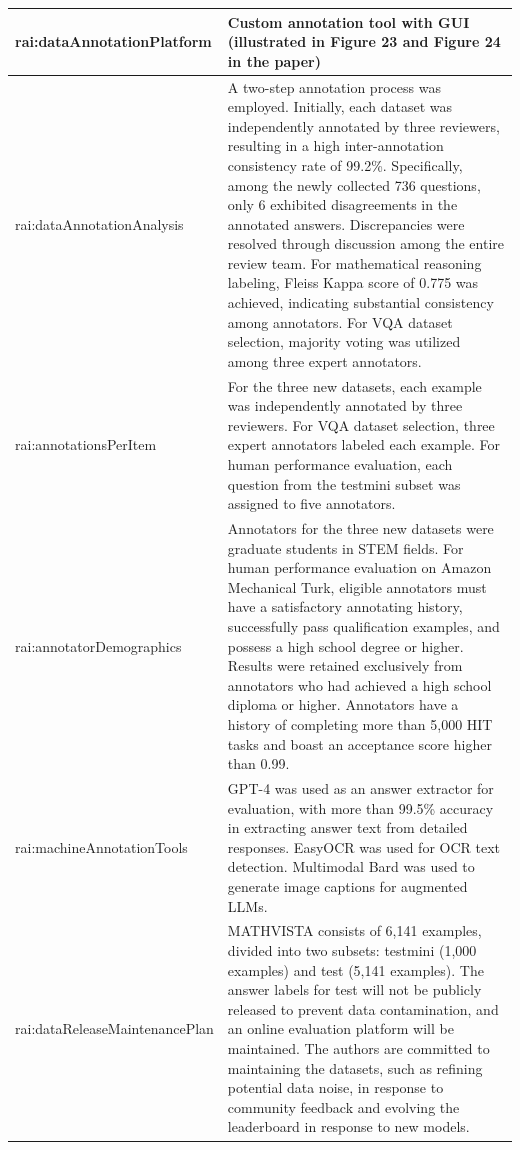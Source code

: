\documentclass[10pt,a4paper]{article}
\begin{document}
\begin{longtable}{|p{4cm}|p{12cm}|}
\hline
rai:dataAnnotationPlatform & Custom annotation tool with GUI (illustrated in Figure 23 and Figure 24 in the paper) \\
\hline
rai:dataAnnotationAnalysis & A two-step annotation process was employed. Initially, each dataset was independently annotated by three reviewers, resulting in a high inter-annotation consistency rate of 99.2\%. Specifically, among the newly collected 736 questions, only 6 exhibited disagreements in the annotated answers. Discrepancies were resolved through discussion among the entire review team. For mathematical reasoning labeling, Fleiss Kappa score of 0.775 was achieved, indicating substantial consistency among annotators. For VQA dataset selection, majority voting was utilized among three expert annotators. \\
\hline
rai:annotationsPerItem & For the three new datasets, each example was independently annotated by three reviewers. For VQA dataset selection, three expert annotators labeled each example. For human performance evaluation, each question from the testmini subset was assigned to five annotators. \\
\hline
rai:annotatorDemographics & Annotators for the three new datasets were graduate students in STEM fields. For human performance evaluation on Amazon Mechanical Turk, eligible annotators must have a satisfactory annotating history, successfully pass qualification examples, and possess a high school degree or higher. Results were retained exclusively from annotators who had achieved a high school diploma or higher. Annotators have a history of completing more than 5,000 HIT tasks and boast an acceptance score higher than 0.99. \\
\hline
rai:machineAnnotationTools & GPT-4 was used as an answer extractor for evaluation, with more than 99.5\% accuracy in extracting answer text from detailed responses. EasyOCR was used for OCR text detection. Multimodal Bard was used to generate image captions for augmented LLMs. \\
\hline
rai:dataReleaseMaintenancePlan & MATHVISTA consists of 6,141 examples, divided into two subsets: testmini (1,000 examples) and test (5,141 examples). The answer labels for test will not be publicly released to prevent data contamination, and an online evaluation platform will be maintained. The authors are committed to maintaining the datasets, such as refining potential data noise, in response to community feedback and evolving the leaderboard in response to new models. \\

\end{longtable}
\end{document}
